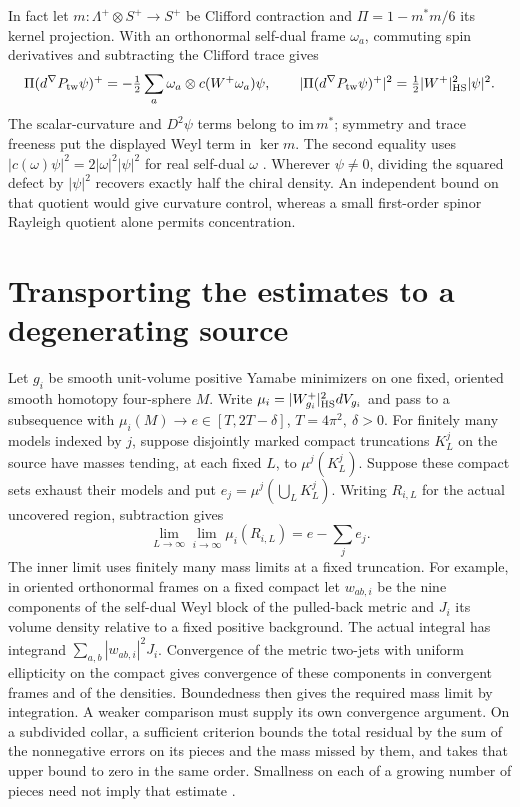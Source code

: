 \documentclass[11pt]{article}
\numberwithin{equation}{section}
\begin{document}
In fact let \(m:\Lambda^+\otimes S^+\to S^+\) be Clifford contraction
and \(\Pi=1-m^*m/6\) its kernel projection. With an orthonormal
self-dual frame \(\omega_a\), commuting spin derivatives and subtracting
the Clifford trace gives
\[
 \Pi(d^\nabla P_{\rm tw}\psi)^+
 =-\tfrac12\sum_a\omega_a\otimes c(W^+\omega_a)\psi,\qquad
 |\Pi(d^\nabla P_{\rm tw}\psi)^+|^2
 =\tfrac12 |W^+|_{\rm HS}^2|\psi|^2.
\]
The scalar-curvature and \(D^2\psi\) terms belong to \(\mathrm{im}\,m^*\);
symmetry and trace freeness put the displayed Weyl term in \(\ker m\).
The second equality uses \(|c(\omega)\psi|^2=2|\omega|^2|\psi|^2\)
for real self-dual \(\omega\) \cite{Baker2026DiracYamabe}.
Wherever \(\psi\ne0\), dividing the squared defect by \(|\psi|^2\)
recovers exactly half the chiral density. An independent bound on that
quotient would give curvature control, whereas a small first-order
spinor Rayleigh quotient alone permits concentration.

\section{Transporting the estimates to a degenerating source}
\label{sec:marked-accounting}

Let \(g_i\) be smooth unit-volume positive Yamabe minimizers on one
fixed, oriented smooth homotopy four-sphere \(M\). Write
\(\mu_i=|W^+_{g_i}|_{\rm HS}^2dV_{g_i}\) and pass to a subsequence
with \(\mu_i(M)\to e\in[T,2T-\delta]\), \(T=4\pi^2,\ \delta>0\).
For finitely many models indexed by \(j\), suppose disjointly marked
compact truncations \(K^j_L\) on the source have masses tending, at
each fixed \(L\), to \(\mu^j(K^j_L)\). Suppose these compact sets
exhaust their models and put \(e_j=\mu^j(\bigcup_L K^j_L)\).
Writing \(R_{i,L}\) for the actual uncovered region, subtraction gives
\begin{equation}\label{eq:finite-remainder}
 \lim_{L\to\infty}\lim_{i\to\infty}\mu_i(R_{i,L})=e-\sum_j e_j .
\end{equation}
The inner limit uses finitely many mass limits at a fixed truncation.
For example, in oriented orthonormal frames on a fixed compact
let \(w_{ab,i}\) be the nine components of the self-dual Weyl block
of the pulled-back metric and \(J_i\) its volume density relative to
a fixed positive background. The actual integral has integrand
\(\sum_{a,b}|w_{ab,i}|^2 J_i\). Convergence of the metric two-jets
with uniform ellipticity on the compact gives convergence of these
components in convergent frames and of the densities. Boundedness
then gives the required mass limit by integration. A weaker comparison
must supply its own convergence argument. On a subdivided collar, a
sufficient criterion bounds the total residual by the sum of the
nonnegative errors on its pieces and the mass missed by them, and
takes that upper bound to zero in the same order. Smallness on each
of a growing number of pieces need not imply that estimate
\cite{Baker2026MarkedNecks,Baker2026DiracTransmission}.
\end{document}
